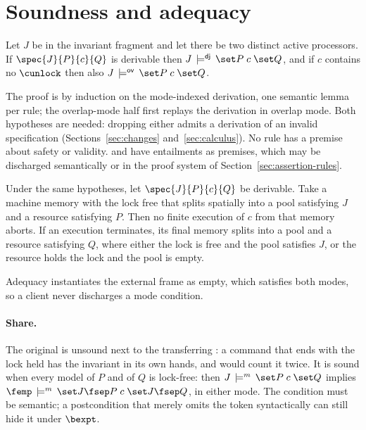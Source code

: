 \section{Soundness and adequacy}
\label{sec:results}

\begin{theorem}
Let $J$ be in the invariant fragment and let there be two distinct active
processors. If $\spec{J}{P}{c}{Q}$ is derivable then
$\mtruespec{J}{\modedj}{P}{c}{Q}$, and if $c$ contains no $\cunlock$ then
also $\mtruespec{J}{\modeov}{P}{c}{Q}$.
\end{theorem}

The proof is by induction on the mode-indexed derivation, one semantic
lemma per rule; the overlap-mode half first replays the derivation in
overlap mode. Both hypotheses are needed: dropping either admits a
derivation of an invalid specification (Sections~\ref{sec:changes}
and~\ref{sec:calculus}).
No rule has a premise about safety or validity.  and 
have entailments as premises, which may be discharged semantically or in
the proof system of Section~\ref{sec:assertion-rules}.

\begin{theorem}
Under the same hypotheses, let $\spec{J}{P}{c}{Q}$ be derivable. Take a
machine memory with the lock free that splits spatially into a pool
satisfying $J$ and a resource satisfying $P$. Then no finite execution of
$c$ from that memory aborts. If an execution terminates, its final memory
splits into a pool and a resource satisfying $Q$, where either the lock is
free and the pool satisfies $J$, or the resource holds the lock and the
pool is empty.
\end{theorem}

Adequacy instantiates the external frame as empty, which satisfies both
modes, so a client never discharges a mode condition.

\paragraph{Share.}
The original  is unsound next to the transferring : a
command that ends with the lock held has the invariant in its own hands,
and  would count it twice. It is sound when every
model of $P$ and of $Q$ is lock-free: then $\mtruespec{J}{m}{P}{c}{Q}$
implies $\mtruespec{\femp}{m}{J \fsep P}{c}{J \fsep Q}$, in either mode. The condition
must be semantic; a postcondition that merely omits the token syntactically
can still hide it under $\bexpt$.

